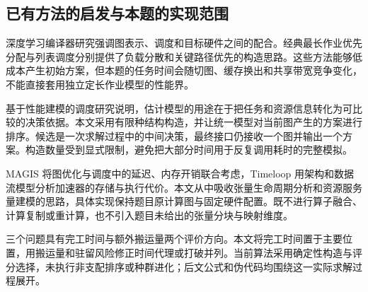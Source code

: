 \subsection{已有方法的启发与本题的实现范围}
深度学习编译器研究强调图表示、调度和目标硬件之间的配合\cite{Liu2025}。经典最长作业优先分配与列表调度分别提供了负载分散和关键路径优先的构造思路\cite{Graham1969,Topcuoglu2002}。这些方法能够低成本产生初始方案，但本题的任务时间会随切图、缓存换出和共享带宽竞争变化，不能直接套用独立定长作业模型的性能界。

基于性能建模的调度研究说明，估计模型的用途在于把任务和资源信息转化为可比较的决策依据\cite{Yang2025}。本文采用有限种结构构造，并让统一模型对当前图产生的方案进行排序。候选是一次求解过程中的中间决策，最终接口仍接收一个图并输出一个方案。构造数量受到显式限制，避免把大部分时间用于反复调用耗时的完整模拟。

MAGIS 将图优化与调度中的延迟、内存开销联合考虑\cite{Chen2024}，Timeloop 用架构和数据流模型分析加速器的存储与执行代价\cite{Parashar2019}。本文从中吸收张量生命周期分析和资源服务量建模的思路，具体实现保持题目原计算图与固定硬件配置。既不进行算子融合、计算复制或重计算，也不引入题目未给出的张量分块与映射维度。

三个问题具有完工时间与额外搬运量两个评价方向。本文将完工时间置于主要位置，用搬运量和驻留风险修正时间代理或打破并列。当前算法采用确定性构造与评分选择，未执行非支配排序或种群进化；后文公式和伪代码均围绕这一实际求解过程展开。
